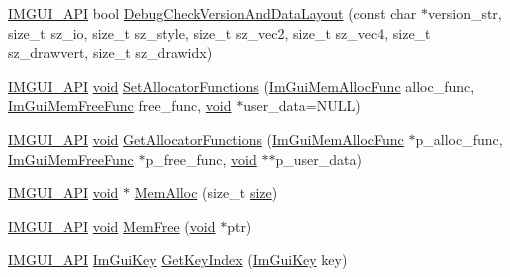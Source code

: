 \begin{DoxyCompactItemize}
\item 
\hyperlink{imgui_8h_a43829975e84e45d1149597467a14bbf5}{I\+M\+G\+U\+I\+\_\+\+A\+PI} bool \hyperlink{namespaceImGui_a9fcc162a6de03ea6ad95457718b0683d}{Debug\+Check\+Version\+And\+Data\+Layout} (const char $\ast$version\+\_\+str, size\+\_\+t sz\+\_\+io, size\+\_\+t sz\+\_\+style, size\+\_\+t sz\+\_\+vec2, size\+\_\+t sz\+\_\+vec4, size\+\_\+t sz\+\_\+drawvert, size\+\_\+t sz\+\_\+drawidx)
\item 
\hyperlink{imgui_8h_a43829975e84e45d1149597467a14bbf5}{I\+M\+G\+U\+I\+\_\+\+A\+PI} \hyperlink{imgui__impl__opengl3__loader_8h_ac668e7cffd9e2e9cfee428b9b2f34fa7}{void} \hyperlink{namespaceImGui_a7c7021b71b8682ba1a816cbca394fc94}{Set\+Allocator\+Functions} (\hyperlink{imgui_8h_a6c044dc9608e01ff454a2b6e3cc5a772}{Im\+Gui\+Mem\+Alloc\+Func} alloc\+\_\+func, \hyperlink{imgui_8h_ad6abffbb2b01431575aad8400461d11f}{Im\+Gui\+Mem\+Free\+Func} free\+\_\+func, \hyperlink{imgui__impl__opengl3__loader_8h_ac668e7cffd9e2e9cfee428b9b2f34fa7}{void} $\ast$user\+\_\+data=N\+U\+LL)
\item 
\hyperlink{imgui_8h_a43829975e84e45d1149597467a14bbf5}{I\+M\+G\+U\+I\+\_\+\+A\+PI} \hyperlink{imgui__impl__opengl3__loader_8h_ac668e7cffd9e2e9cfee428b9b2f34fa7}{void} \hyperlink{namespaceImGui_a855f163c9a30e8af87aa9c56a3478b0e}{Get\+Allocator\+Functions} (\hyperlink{imgui_8h_a6c044dc9608e01ff454a2b6e3cc5a772}{Im\+Gui\+Mem\+Alloc\+Func} $\ast$p\+\_\+alloc\+\_\+func, \hyperlink{imgui_8h_ad6abffbb2b01431575aad8400461d11f}{Im\+Gui\+Mem\+Free\+Func} $\ast$p\+\_\+free\+\_\+func, \hyperlink{imgui__impl__opengl3__loader_8h_ac668e7cffd9e2e9cfee428b9b2f34fa7}{void} $\ast$$\ast$p\+\_\+user\+\_\+data)
\item 
\hyperlink{imgui_8h_a43829975e84e45d1149597467a14bbf5}{I\+M\+G\+U\+I\+\_\+\+A\+PI} \hyperlink{imgui__impl__opengl3__loader_8h_ac668e7cffd9e2e9cfee428b9b2f34fa7}{void} $\ast$ \hyperlink{namespaceImGui_aed896913f2e140cd0ad7431060dba50b}{Mem\+Alloc} (size\+\_\+t \hyperlink{imgui__impl__opengl3__loader_8h_a3d1e3edfcf61ca2d831883e1afbad89e}{size})
\item 
\hyperlink{imgui_8h_a43829975e84e45d1149597467a14bbf5}{I\+M\+G\+U\+I\+\_\+\+A\+PI} \hyperlink{imgui__impl__opengl3__loader_8h_ac668e7cffd9e2e9cfee428b9b2f34fa7}{void} \hyperlink{namespaceImGui_a269ec695c6e722ec3da85dae37f0675d}{Mem\+Free} (\hyperlink{imgui__impl__opengl3__loader_8h_ac668e7cffd9e2e9cfee428b9b2f34fa7}{void} $\ast$ptr)
\item 
\hyperlink{imgui_8h_a43829975e84e45d1149597467a14bbf5}{I\+M\+G\+U\+I\+\_\+\+A\+PI} \hyperlink{imgui_8h_aa22ffe36b188427d712447ec465203d4}{Im\+Gui\+Key} \hyperlink{namespaceImGui_a03f5c2b43767af1947c9a9eea38a367d}{Get\+Key\+Index} (\hyperlink{imgui_8h_aa22ffe36b188427d712447ec465203d4}{Im\+Gui\+Key} key)
$$
\end{DoxyCompactItemize}
